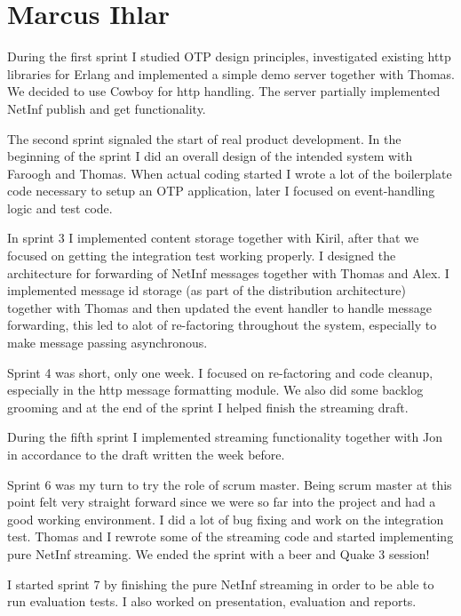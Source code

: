 \section{Marcus Ihlar}
During the first sprint I studied OTP design principles, investigated existing http libraries for Erlang and implemented a simple demo server together with Thomas. We decided to use Cowboy for http handling. The server partially implemented NetInf publish and get functionality.

The second sprint signaled the start of real product development. In the beginning of the sprint I did an overall design of the intended system with Faroogh and Thomas. When actual coding started I wrote a lot of the boilerplate code necessary to setup an OTP application, later I focused on event-handling logic and test code.

In sprint 3 I implemented content storage together with Kiril, after that we focused on getting the integration test working properly. I designed the architecture for forwarding of NetInf messages together with Thomas and Alex. I implemented message id storage (as part of the distribution architecture) together with Thomas and then updated the event handler to handle message forwarding, this led to alot of re-factoring throughout the system, especially to make message passing asynchronous. 

Sprint 4 was short, only one week. I focused on re-factoring and code cleanup, especially in the http message formatting module. We also did some backlog grooming and at the end of the sprint I helped finish the streaming draft.

During the fifth sprint I implemented streaming functionality together with Jon in accordance to the draft written the week before. 

Sprint 6 was my turn to try the role of scrum master. Being scrum master at this point felt very straight forward since we were so far into the project and had a good working environment. I did a lot of bug fixing and work on the integration test. Thomas and I rewrote some of the streaming code and started implementing pure NetInf streaming. We ended the sprint with a beer and Quake 3 session!

I started sprint 7 by finishing the pure NetInf streaming in order to be able to run evaluation tests. I also worked on presentation, evaluation and reports.
 

 



